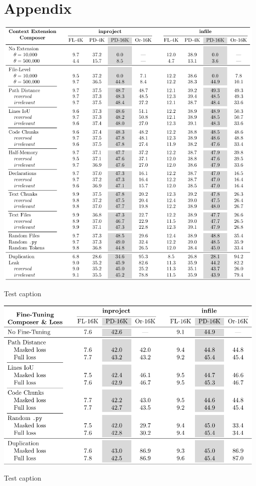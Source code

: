 \chapter{Appendix}

\begin{table}[htbp]
    \centering
    \includegraphics[width=\textwidth]{tables/rq_b.pdf}
    \caption{Test caption}\label{tab:ocoder-extension}
\end{table}

\begin{table}[htbp]
    \centering
    \includegraphics[width=\textwidth]{tables/rq_a2_gradient_masking.pdf}
    \caption{Test caption}\label{tab:dseek-gradient-masking}
\end{table}

